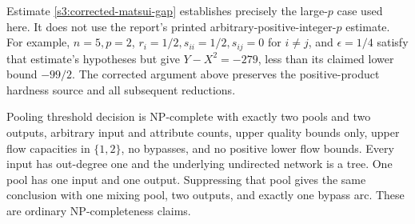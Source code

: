 \begin{remark}\label{s3:matsui-scope}
Estimate \eqref{s3:corrected-matsui-gap} establishes precisely the
large-$p$ case used here. It does not use the report's printed
arbitrary-positive-integer-$p$ estimate. For example, $n=5,p=2$,
$r_i=1/2,s_{ii}=1/2,s_{ij}=0$ for $i\ne j$, and
$\epsilon=1/4$ satisfy that estimate's hypotheses but give
$Y-X^2=-279$, less than its claimed lower bound $-99/2$.
The corrected argument above preserves the positive-product hardness
source and all subsequent reductions.
\end{remark}

\begin{theorem}\label{s3:two-pools}
Pooling threshold decision is NP-complete with exactly two pools and two
outputs, arbitrary input and attribute counts, upper quality bounds only,
upper flow capacities in $\{1,2\}$, no bypasses, and no positive lower
flow bounds. Every input has out-degree one and the underlying undirected
network is a tree. One pool has one input and one output. Suppressing
that pool gives the same conclusion with one mixing pool, two outputs,
and exactly one bypass arc. These are ordinary NP-completeness claims.
\end{theorem}
